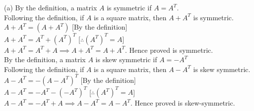 \documentclass[addpoints]{exam}
\begin{document}
\begin{sloppypar}
\begin{questions}
\begin{solution}
        (a) By the definition, a matrix $A$ is symmetric if $ A = A^T $. \\ 
        Following the definition, if $A$ is a square matrix, then $ A + A^T $ is symmetric. \\ 
        $ A + A^T = (A + A^T) $ \hspace{20mm} [By the definition] \\ 
        $ A + A^T = A^T + (A^T)^T $ \hspace{15.5mm} [$ \therefore (A^T)^T = A $] \\ 
        $ A + A^T = A^T + A \implies A + A^T = A + A^T$. Hence proved is symmetric. \\ 
        By the definition, a matrix $A$ is skew symmetric if $ A = -A^T $ \\ 
        Following the definition, if $A$ is a square matrix, then $ A - A^T $ is skew symmetric. \\ 
        $ A - A^T = - (A - A^T)^T $ \hspace{20mm} [By the definition] \\ 
        $ A - A^T = -A^T - (-A^T)^T $ \hspace{15mm} [$ \therefore (A^T)^T = A $] \\ 
        $ A - A^T = - A^T + A \implies A - A^T = A - A^T $. Hence proved is skew-symmetric.
    \end{solution}


\end{questions}
\end{sloppypar}
\end{document}
